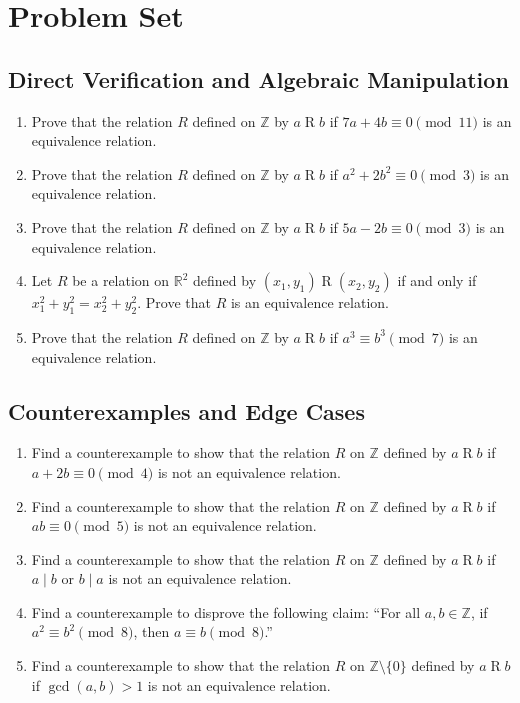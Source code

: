 \documentclass[11pt, a4paper]{article}
\theoremstyle{definition}
\theoremstyle{remark}
\newcommand{\R}{\mathbb{R}}
\newcommand{\Z}{\mathbb{Z}}
\begin{document}
\newpage

\section{Problem Set}

\subsection{Direct Verification and Algebraic Manipulation}
\begin{enumerate}[label=\textbf{\arabic*.}]
    \item Prove that the relation $R$ defined on $\Z$ by $a \mathrel{R} b$ if $7a + 4b \equiv 0 \pmod{11}$ is an equivalence relation.
    \item Prove that the relation $R$ defined on $\Z$ by $a \mathrel{R} b$ if $a^2 + 2b^2 \equiv 0 \pmod{3}$ is an equivalence relation.
    \item Prove that the relation $R$ defined on $\Z$ by $a \mathrel{R} b$ if $5a - 2b \equiv 0 \pmod{3}$ is an equivalence relation.
    \item Let $R$ be a relation on $\R^2$ defined by $(x_1, y_1) \mathrel{R} (x_2, y_2)$ if and only if $x_1^2 + y_1^2 = x_2^2 + y_2^2$. Prove that $R$ is an equivalence relation.
    \item Prove that the relation $R$ defined on $\Z$ by $a \mathrel{R} b$ if $a^3 \equiv b^3 \pmod{7}$ is an equivalence relation.
\end{enumerate}

\subsection{Counterexamples and Edge Cases}
\begin{enumerate}[label=\textbf{\arabic*.}, resume]
    \item Find a counterexample to show that the relation $R$ on $\Z$ defined by $a \mathrel{R} b$ if $a + 2b \equiv 0 \pmod{4}$ is not an equivalence relation.
    \item Find a counterexample to show that the relation $R$ on $\Z$ defined by $a \mathrel{R} b$ if $ab \equiv 0 \pmod{5}$ is not an equivalence relation.
    \item Find a counterexample to show that the relation $R$ on $\Z$ defined by $a \mathrel{R} b$ if $a \mid b$ or $b \mid a$ is not an equivalence relation.
    \item Find a counterexample to disprove the following claim: ``For all $a, b \in \Z$, if $a^2 \equiv b^2 \pmod{8}$, then $a \equiv b \pmod{8}$.''
    \item Find a counterexample to show that the relation $R$ on $\Z \setminus \{0\}$ defined by $a \mathrel{R} b$ if $\gcd(a,b) > 1$ is not an equivalence relation.
\end{enumerate}
\end{document}
